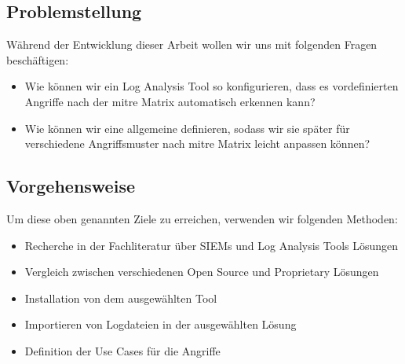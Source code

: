 \subsection{Problemstellung}
Während der Entwicklung dieser Arbeit wollen wir uns mit folgenden Fragen beschäftigen: 

\begin{itemize}
   \item Wie können wir ein Log Analysis Tool so konfigurieren, dass es vordefinierten Angriffe nach der \gls{mitre} Matrix automatisch erkennen kann? 
   \item Wie können wir eine allgemeine  definieren, sodass wir sie später für verschiedene Angriffsmuster nach \gls{mitre} Matrix leicht anpassen können?
\end{itemize}


\subsection{Vorgehensweise}
Um diese oben genannten Ziele zu erreichen, verwenden wir folgenden Methoden: 

\begin{itemize}[noitemsep]
   \item	Recherche in der Fachliteratur über SIEMs und Log Analysis Tools Lösungen 
   \item	Vergleich zwischen verschiedenen Open Source und Proprietary Lösungen 
   \item	Installation von dem ausgewählten Tool 
   \item	Importieren von Logdateien in der ausgewählten Lösung 
   \item	Definition der Use Cases für die Angriffe
\end{itemize}